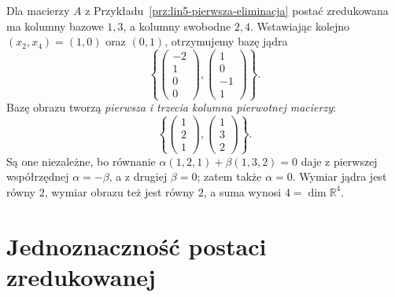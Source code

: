\begin{przyklad}
\label{prz:lin5-bazy}
Dla macierzy \(A\) z
Przykładu~\ref{prz:lin5-pierwsza-eliminacja}
postać zredukowana ma kolumny bazowe
\(1,3\), a kolumny swobodne \(2,4\).
Wstawiając kolejno \((x_2,x_4)=(1,0)\)
oraz \((0,1)\), otrzymujemy bazę jądra
\[
 \left\{
 \begin{pmatrix}-2\\1\\0\\0\end{pmatrix},
 \begin{pmatrix}1\\0\\-1\\1\end{pmatrix}
 \right\}.
\]
Bazę obrazu tworzą \emph{pierwsza i trzecia
kolumna pierwotnej macierzy}:
\[
 \left\{
 \begin{pmatrix}1\\2\\1\end{pmatrix},
 \begin{pmatrix}1\\3\\2\end{pmatrix}
 \right\}.
\]
Są one niezależne, bo równanie
\(\alpha(1,2,1)+\beta(1,3,2)=0\)
daje z pierwszej współrzędnej
\(\alpha=-\beta\), a z drugiej
\(\beta=0\); zatem także \(\alpha=0\).
Wymiar jądra jest równy \(2\),
wymiar obrazu też jest równy \(2\),
a suma wynosi \(4=\dim\mathbb R^4\).
\end{przyklad}

\section{Jednoznaczność postaci zredukowanej}
\label{sec:lin5-jednoznacznosc}

